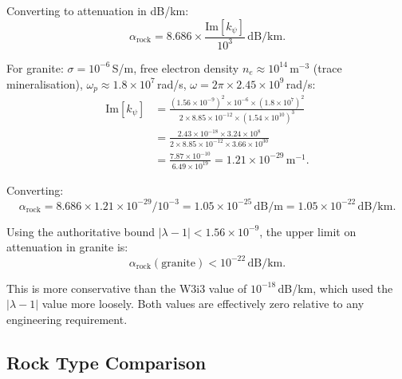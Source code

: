 \documentclass[aps,prd,twocolumn,superscriptaddress]{revtex4-2}
\newcommand{\lambdaone}{|\lambda{-}1|}
\newcommand{\alpharock}{\alpha_\mathrm{rock}}
\begin{document}
Converting to attenuation in dB/km:
\begin{equation}
\alpharock = 8.686 \times \frac{\mathrm{Im}[k_\psi]}{10^3}\,\mathrm{dB/km}.
\label{eq:alpha_rock_def}
\end{equation}

For granite: $\sigma = 10^{-6}$\,S/m, free electron density
$n_e \approx 10^{14}$\,m$^{-3}$ (trace mineralisation),
$\omega_p \approx 1.8\times10^7$\,rad/s, $\omega = 2\pi\times2.45\times10^9$\,rad/s:
\begin{align}
\mathrm{Im}[k_\psi] &= \frac{(1.56\times10^{-9})^2 \times 10^{-6}
  \times (1.8\times10^7)^2}
  {2\times8.85\times10^{-12}\times(1.54\times10^{10})^3}
\nonumber\\
&= \frac{2.43\times10^{-18} \times 3.24\times10^{8}}
  {2\times8.85\times10^{-12}\times3.66\times10^{30}}
\nonumber\\
&= \frac{7.87\times10^{-10}}
  {6.49\times10^{19}}
= 1.21\times10^{-29}\,\mathrm{m}^{-1}.
\label{eq:Im_kpsi_num}
\end{align}

Converting:
\begin{equation}
\alpharock = 8.686 \times 1.21\times10^{-29} / 10^{-3}
= 1.05\times10^{-25}\,\mathrm{dB/m}
= 1.05\times10^{-22}\,\mathrm{dB/km}.
\label{eq:alpha_rock_granite}
\end{equation}

Using the authoritative bound $\lambdaone < 1.56\times10^{-9}$,
the upper limit on attenuation in granite is:
\begin{equation}
\boxed{\alpharock(\mathrm{granite}) < 10^{-22}\,\mathrm{dB/km}.}
\label{eq:alpha_rock_bound}
\end{equation}

This is more conservative than the W3i3 value of $10^{-18}$\,dB/km,
which used the $\lambdaone$ value more loosely.  Both values are
effectively zero relative to any engineering requirement.

\subsection{Rock Type Comparison}
\end{document}
